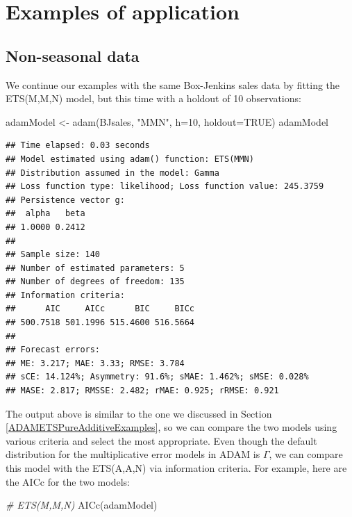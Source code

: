 \documentclass[
]{book}
\newenvironment{Shaded}{\begin{snugshade}}{\end{snugshade}}
\newcommand{\AttributeTok}[1]{\textcolor[rgb]{0.77,0.63,0.00}{#1}}
\newcommand{\CommentTok}[1]{\textcolor[rgb]{0.56,0.35,0.01}{\textit{#1}}}
\newcommand{\ConstantTok}[1]{\textcolor[rgb]{0.00,0.00,0.00}{#1}}
\newcommand{\DecValTok}[1]{\textcolor[rgb]{0.00,0.00,0.81}{#1}}
\newcommand{\FunctionTok}[1]{\textcolor[rgb]{0.00,0.00,0.00}{#1}}
\newcommand{\NormalTok}[1]{#1}
\newcommand{\OtherTok}[1]{\textcolor[rgb]{0.56,0.35,0.01}{#1}}
\newcommand{\StringTok}[1]{\textcolor[rgb]{0.31,0.60,0.02}{#1}}
\theoremstyle{definition}
\theoremstyle{definition}
\theoremstyle{definition}
\theoremstyle{definition}
\theoremstyle{remark}
\begin{document}
\hypertarget{ADAMETSMultiplicativeExamples}{%
\section{Examples of application}\label{ADAMETSMultiplicativeExamples}}

\hypertarget{non-seasonal-data-1}{%
\subsection{Non-seasonal data}\label{non-seasonal-data-1}}

We continue our examples with the same Box-Jenkins sales data by fitting the ETS(M,M,N) model, but this time with a holdout of 10 observations:

\begin{Shaded}
\begin{Highlighting}[]
\NormalTok{adamModel }\OtherTok{\textless{}{-}} \FunctionTok{adam}\NormalTok{(BJsales, }\StringTok{"MMN"}\NormalTok{, }\AttributeTok{h=}\DecValTok{10}\NormalTok{, }\AttributeTok{holdout=}\ConstantTok{TRUE}\NormalTok{)}
\NormalTok{adamModel}
\end{Highlighting}
\end{Shaded}

\begin{verbatim}
## Time elapsed: 0.03 seconds
## Model estimated using adam() function: ETS(MMN)
## Distribution assumed in the model: Gamma
## Loss function type: likelihood; Loss function value: 245.3759
## Persistence vector g:
##  alpha   beta 
## 1.0000 0.2412 
## 
## Sample size: 140
## Number of estimated parameters: 5
## Number of degrees of freedom: 135
## Information criteria:
##      AIC     AICc      BIC     BICc 
## 500.7518 501.1996 515.4600 516.5664 
## 
## Forecast errors:
## ME: 3.217; MAE: 3.33; RMSE: 3.784
## sCE: 14.124%; Asymmetry: 91.6%; sMAE: 1.462%; sMSE: 0.028%
## MASE: 2.817; RMSSE: 2.482; rMAE: 0.925; rRMSE: 0.921
\end{verbatim}

The output above is similar to the one we discussed in Section \ref{ADAMETSPureAdditiveExamples}, so we can compare the two models using various criteria and select the most appropriate. Even though the default distribution for the multiplicative error models in ADAM is \(\Gamma\), we can compare this model with the ETS(A,A,N) via information criteria. For example, here are the AICc for the two models:

\begin{Shaded}
\begin{Highlighting}[]
\CommentTok{\# ETS(M,M,N)}
\FunctionTok{AICc}\NormalTok{(adamModel)}
\end{Highlighting}
\end{Shaded}
\end{document}
